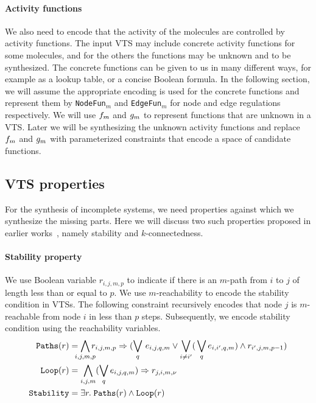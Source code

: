 \paragraph{Activity functions}
%
We also need to encode that the activity of the molecules are
controlled by activity functions.
%
The input VTS may include concrete activity functions for some molecules,
and for the others the functions may be unknown and to be synthesized. 
%
The concrete functions can be given to us in many different ways,
for example as a lookup table, or a concise Boolean formula.
%
In the following section, we will assume the appropriate encoding is
used for the concrete functions and represent them by \texttt{NodeFun}$_m$
and \texttt{EdgeFun}$_m$ for node and edge regulations respectively.
%
We will use $f_m$ and $g_m$ to represent functions that
are unknown in a VTS.
%
%
Later we will be synthesizing the unknown activity functions and 
replace $f_m$ and $g_m$ with parameterized constraints that
encode a space of candidate functions.

\subsection{VTS properties}

For the synthesis of incomplete systems,
we need properties against which we synthesize the missing parts.
%
Here we will discuss two such properties proposed in earlier
works~\cite{smtVTS}, namely stability and $k$-connectedness.
%

\paragraph{Stability property}
%
We use Boolean variable $r_{i,j,m,p}$ to indicate if there is an
$m$-path from $i$ to $j$ of length less than or equal to $p$.
%
We use $m$-reachability to encode the stability condition in VTSs.
%
The following constraint recursively encodes that node $j$ is
$m$-reachable from node $i$ in less than $p$ steps.
%
Subsequently, we encode stability condition using the reachability variables.
\begin{align*}
  \texttt{Paths}(r) &= \bigwedge\limits_{\mathclap{i,j,m,p}} r_{i,j,m,p} \limplies (\bigvee_{q} \, e_{i,j,q,m} \lor \bigvee_{i\neq i^{\prime}} ( \, \bigvee_{q} e_{i,i^{\prime},q,m}) \land r_{i^{\prime},j,m,p-1} )
  \\
  \texttt{Loop}(r) &= \bigwedge\limits_{i,j,m} (\bigvee_{q} e_{i,j,q,m}) \limplies r_{j,i,m,\nu}
  \\
  \texttt{Stability} &= \exists r. \; \texttt{Paths}(r) \land \texttt{Loop}(r)
\end{align*}

